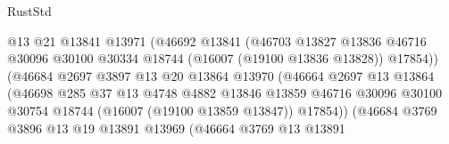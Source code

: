 \begin{lexlean}{RustStd}
\begin{coremodule}
                                      @13
                                      @21
                                      @13841
                                      @13971
                                      (@46692
                                        @13841
                                        (@46703
                                          @13827
                                          @13836
                                          @46716
                                          @30096
                                          @30100
                                          @30334
                                          @18744
                                          (@16007 (@19100 @13836 @13828))
                                          @17854))
                                      (@46684
                                        @2697
                                        @3897
                                        @13
                                        @20
                                        @13864
                                        @13970
                                        (@46664
                                          @2697
                                          @13
                                          @13864
                                          (@46698
                                            @285
                                            @37
                                            @13
                                            @4748
                                            @4882
                                            @13846
                                            @13859
                                            @46716
                                            @30096
                                            @30100
                                            @30754
                                            @18744
                                            (@16007 (@19100 @13859 @13847))
                                            @17854))
                                        (@46684
                                          @3769
                                          @3896
                                          @13
                                          @19
                                          @13891
                                          @13969
                                          (@46664
                                            @3769
                                            @13
                                            @13891

\end{coremodule}
\end{lexlean}

